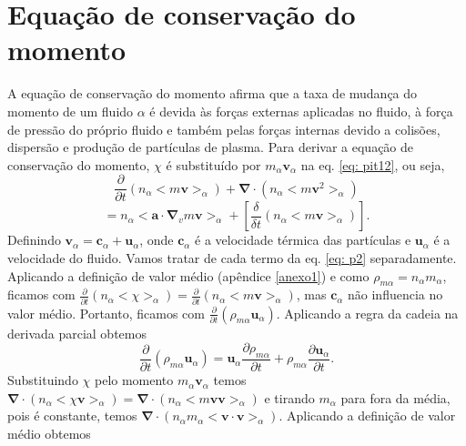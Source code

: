 \documentclass[12pt,oneside,a4paper]{abntex2}
\begin{document}
\section{Equação de conservação do momento}
\noindent A equação de conservação do momento afirma que a taxa de mudança do momento de um fluido $\alpha$ é devida às forças externas aplicadas no fluido, à força de pressão do próprio fluido e também pelas forças internas devido a colisões, dispersão e produção de partículas de plasma.
Para derivar a equação de conservação do momento, $\chi$ é substituído por $m_\alpha \bm{v}_\alpha$ na eq. \ref{eq: pit12}, ou seja,
\begin{equation}
\label{eq: p2}
\frac{\partial }{\partial t}(n_\alpha<m \bm{v}>_\alpha) + \bm{\nabla} \cdot (n_\alpha<m \bm{v}^2 >_\alpha) 
\end{equation}
\begin{equation*}
= n_\alpha<\bm{a} \cdot \bm{\nabla}_v m \bm{v}>_\alpha +[\frac{\delta}{\delta t}(n_\alpha<m \bm{v}>_\alpha)].
\end{equation*}
Definindo $\bm{v}_\alpha = \bm{c}_\alpha + \bm{u}_\alpha$, onde $\bm{c}_\alpha$ é a velocidade térmica das partículas e  $\bm{u}_\alpha$ é a velocidade do fluido. 
Vamos tratar de cada termo da eq. \ref{eq: p2} separadamente.
Aplicando a definição de valor médio (apêndice \ref{anexo1}) e como $ \rho_{m\alpha} = n_\alpha m_\alpha$, ficamos com $\frac{\partial }{\partial t} (n_\alpha <\chi>_\alpha)=\frac{\partial }{\partial t} (n_\alpha <m \bm{v}>_\alpha)$, mas $\bm{c}_\alpha$ não influencia no valor médio. Portanto, ficamos com $\frac{\partial }{\partial t} (\rho_{m\alpha} \bm{u}_\alpha)$. 
Aplicando a regra da cadeia na derivada parcial obtemos
\begin{equation}
\label{eq: pit14}
\frac{\partial }{\partial t} (\rho_{m\alpha} \bm{u}_\alpha) = \bm{u}_\alpha \frac{\partial \rho_{m\alpha}}{\partial t}+\rho_{m\alpha} \frac{\partial \bm{u}_\alpha}{\partial t}.
\end{equation} 
Substituindo $\chi$ pelo momento $m_\alpha \bm{v}_\alpha$ temos $\bm{\nabla} \cdot (n_\alpha <\chi \bm{v}>_\alpha) =  \bm{\nabla} \cdot (n_\alpha <m \bm{v} \bm{v}>_\alpha)$ e tirando $m_\alpha$ para fora da média, pois é constante, temos $\bm{\nabla} \cdot (n_\alpha m_\alpha < \bm{v} \cdot \bm{v}>_\alpha)$. %
Aplicando a definição de valor médio obtemos 
\end{document}
